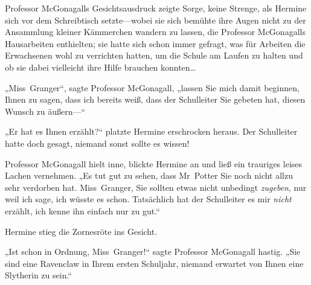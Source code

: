 Professor McGonagalls Gesichtsausdruck zeigte Sorge, keine Strenge, als Hermine sich vor dem Schreibtisch setzte—wobei sie sich bemühte ihre Augen nicht zu der Ansammlung kleiner Kämmerchen wandern zu lassen, die Professor McGonagalls Hausarbeiten enthielten; sie hatte sich schon immer gefragt, was für Arbeiten die Erwachsenen wohl zu verrichten hatten, um die Schule am Laufen zu halten und ob sie dabei vielleicht ihre Hilfe brauchen konnten…

„Miss~Granger“, sagte Professor McGonagall, „lassen Sie mich damit beginnen, Ihnen zu sagen, dass ich bereits weiß, dass der Schulleiter Sie gebeten hat, diesen Wunsch zu äußern—“

„Er hat es Ihnen erzählt?“ platzte Hermine erschrocken heraus. Der Schulleiter hatte doch gesagt, niemand sonst sollte es wissen!

Professor McGonagall hielt inne, blickte Hermine an und ließ ein trauriges leises Lachen vernehmen.
„Es tut gut zu sehen, dass Mr~Potter Sie noch nicht allzu sehr verdorben hat. Miss~Granger, Sie sollten etwas nicht unbedingt \emph{zugeben}, nur weil ich sage, ich wüsste es schon. Tatsächlich hat der Schulleiter es mir \emph{nicht} erzählt, ich kenne ihn einfach nur zu gut.“

Hermine stieg die Zornesröte ins Gesicht.

„Ist schon in Ordnung, Miss~Granger!“ sagte Professor McGonagall hastig.
„Sie sind eine Ravenclaw in Ihrem ersten Schuljahr, niemand erwartet von Ihnen eine Slytherin zu sein.“

